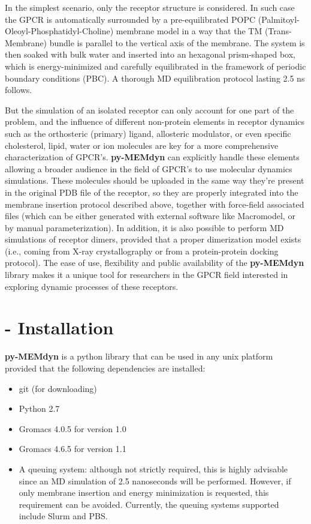 \documentclass[10pt, oneside, pdftex]{article}
\begin{document}
In   the   simplest  scenario,   only   the   receptor  structure   is
considered. In  such case  the GPCR is  automatically surrounded  by a
pre-equilibrated POPC (Palmitoyl-Oleoyl-Phosphatidyl-Choline) membrane
model in a way that the  TM (Trans-Membrane) bundle is parallel to the
vertical axis  of the  membrane. The system  is then soaked  with bulk
water  and  inserted into  an  hexagonal  prism-shaped  box, which  is
energy-minimized  and  carefully  equilibrated  in  the  framework  of
periodic  boundary  conditions  (PBC).  A  thorough  MD  equilibration
protocol lasting 2.5 ns follows.

But the  simulation of an isolated  receptor can only  account for one
part  of  the problem,  and  the  influence  of different  non-protein
elements  in  receptor  dynamics  such as  the  orthosteric  (primary)
ligand,  allosteric modulator,  or even  specific  cholesterol, lipid,
water   or  ion   molecules   are  key   for   a  more   comprehensive
characterization of GPCR's.   \textbf{py-MEMdyn} can explicitly handle
these elements allowing  a broader audience in the  field of GPCR's to
use molecular dynamics simulations. These molecules should be uploaded
in  the same  way they're  present  in the  original PDB  file of  the
receptor, so they are  properly integrated into the membrane insertion
protocol described  above, together with  force-field associated files
(which can be either generated with external software like Macromodel,
or by manual  parameterization).  In addition, it is  also possible to
perform  MD simulations  of receptor  dimers, provided  that  a proper
dimerization model exists (i.e.,  coming from X-ray crystallography or
from  a   protein-protein  docking   protocol).   The  ease   of  use,
flexibility and public  availability of the \textbf{py-MEMdyn} library
makes it a unique tool for researchers in the GPCR field interested in
exploring dynamic processes of these receptors.

\section*{ - Installation}
\textbf{py-MEMdyn} is a python library that can be used in  any unix
platform provided that the following dependencies are installed:
\begin{itemize}\itemsep0em
\item {git (for downloading)}
\item {Python 2.7}
\item {Gromacs 4.0.5 for version 1.0}
\item {Gromacs 4.6.5 for version 1.1}
\item  {A queuing  system:  although not  strictly  required, this  is
  highly advisable since  an MD simulation of 2.5  nanoseconds will be
  performed.   However,  if   only  membrane   insertion   and  energy
  minimization    is    requested,    this    requirement    can    be
  avoided. Currently, the queuing  systems supported include Slurm and
  PBS.}
\end{itemize}
\end{document}
